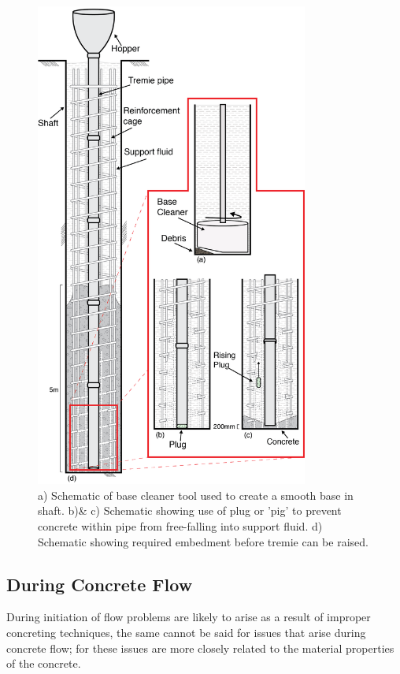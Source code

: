 \begin{figure}[H]
\centering
\includegraphics[width=0.8\textwidth]{initial_flow_issues.png}
\caption{\label{fig:flow_init} a) Schematic of base cleaner tool used to create a smooth base in shaft. b)\& c) Schematic showing use of plug or 'pig' to prevent concrete within pipe from free-falling into support fluid. d) Schematic showing required embedment before tremie can be raised.}
\end{figure}

\subsection{During Concrete Flow}

During initiation of flow problems are likely to arise as a result of improper concreting techniques, the same cannot be said for issues that arise during concrete flow; for these issues are more closely related to the material properties of the concrete.\\

